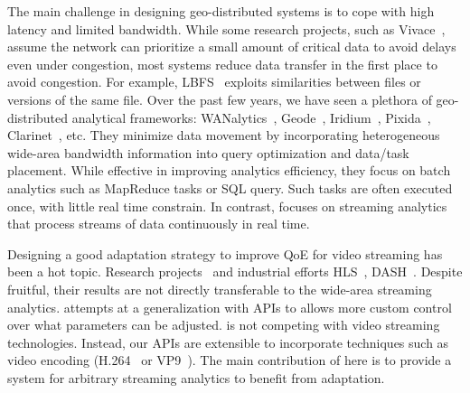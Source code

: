  The main challenge in designing geo-distributed
systems is to cope with high latency and limited bandwidth. While some research
projects, such as Vivace~\cite{cho2012surviving}, assume the network can
prioritize a small amount of critical data to avoid delays even under
congestion, most systems reduce data transfer in the first place to avoid
congestion. For example, LBFS~\cite{muthitacharoen2001low} exploits similarities
between files or versions of the same file. Over the past few years, we have
seen a plethora of geo-distributed analytical frameworks:
WANalytics~\cite{vulimiri2015wananlytics}, Geode~\cite{vulimiri2015global},
Iridium~\cite{pu2015low}, Pixida~\cite{kloudas2015pixida},
Clarinet~\cite{viswanathan2016clarinet}, etc. They minimize data movement by
incorporating heterogeneous wide-area bandwidth information into query
optimization and data/task placement. While effective in improving analytics
efficiency, they focus on batch analytics such as MapReduce tasks or SQL
query. Such tasks are often executed once, with little real time constrain. In
contrast, \sysname{} focuses on streaming analytics that process streams of data
continuously in real time.









 Designing a good adaptation strategy to improve
QoE for video streaming has been a hot topic. Research
projects~\cite{yin2015control, sun2016cs2p} and industrial efforts
HLS~\cite{pantos2016http}, DASH~\cite{sodagar2011mpeg,
  michalos2012dynamic}. Despite fruitful, their results are not directly
transferable to the wide-area streaming analytics. \sysname{} attempts at a
generalization with \maybe{} APIs to allows more custom control over what
parameters can be adjusted. \sysname{} is not competing with video streaming
technologies. Instead, our APIs are extensible to incorporate techniques such as
video encoding (H.264~\cite{richardson2011h} or VP9~\cite{grange2016vp9}). The
main contribution of \sysname{} here is to provide a system for arbitrary
streaming analytics to benefit from adaptation.

